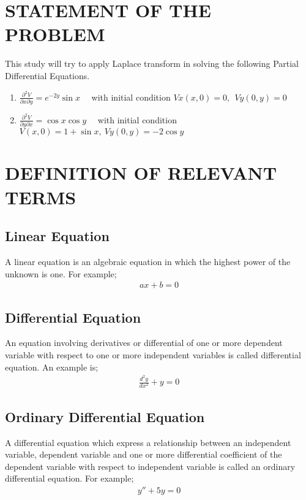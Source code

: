 \documentclass[11pt]{report}
\newcommand{\dsp}{\displaystyle}
\newcommand{\dprime}{''}
\begin{document}
	\section{STATEMENT OF THE PROBLEM}
	This study will try to apply Laplace transform in solving the following Partial Differential Equations.\\
	\begin{enumerate}
		\item $\dsp \frac{\partial^2 V}{\partial x\partial y} = e^{-2y}\sin x$ ~~with initial condition $Vx(x,0)=0, ~~Vy(0,y) =0$
		\item $\dsp \frac{\partial^2 V}{\partial y \partial x}= \cos x \cos y$~~ with initial condition $V(x,0)=1+\sin x, ~ Vy(0,y)=-2\cos y$
	\end{enumerate}

		\section{DEFINITION OF RELEVANT TERMS}
	\subsection{Linear Equation}
	A linear equation is an algebraic equation in which the highest power of the unknown is one. For example;
	\begin{eqnarray}
		ax+b=0\label{eq:3_3}
	\end{eqnarray}
	
	\subsection{Differential Equation}
	An equation involving derivatives or differential of one or more dependent variable with respect to one or more independent variables is called differential equation. An example is;
	\begin{eqnarray}
		\frac{d^2y}{dx^2} + y = 0\label{eq:3_4}
	\end{eqnarray}
	
	\subsection{Ordinary Differential Equation}
	A differential equation which express a relationship between an independent variable, dependent variable and one or more differential coefficient of the dependent variable with respect to independent variable is called an ordinary differential equation. For example;
	\begin{eqnarray}
		y\dprime + 5y = 0 \label{eq:3_5}
	\end{eqnarray}
	
\end{document}
